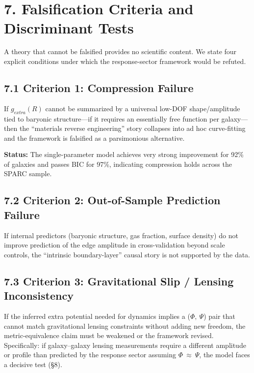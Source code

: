 \section{7. Falsification Criteria and Discriminant Tests}\label{falsification-criteria-and-discriminant-tests}

A theory that cannot be falsified provides no scientific content. We state four explicit conditions under which the response-sector framework would be refuted.

\subsection{7.1 Criterion 1: Compression Failure}\label{criterion-1-compression-failure}

If \(g_{extra}(R)\) cannot be summarized by a universal low-DOF shape/amplitude tied to baryonic structure---if it requires an essentially free function per galaxy---then the ``materials reverse engineering'' story collapses into ad hoc curve-fitting and the framework is falsified as a parsimonious alternative.

\textbf{Status:} The single-parameter model achieves very strong improvement for 92\% of galaxies and passes BIC for 97\%, indicating compression holds across the SPARC sample.

\subsection{7.2 Criterion 2: Out-of-Sample Prediction Failure}\label{criterion-2-out-of-sample-prediction-failure}

If internal predictors (baryonic structure, gas fraction, surface density) do not improve prediction of the edge amplitude in cross-validation beyond scale controls, the ``intrinsic boundary-layer'' causal story is not supported by the data.

\subsection{7.3 Criterion 3: Gravitational Slip / Lensing Inconsistency}\label{criterion-3-gravitational-slip-lensing-inconsistency}

If the inferred extra potential needed for dynamics implies a (\(\Phi,\ \Psi\)) pair that cannot match gravitational lensing constraints without adding new freedom, the metric-equivalence claim must be weakened or the framework revised. Specifically: if galaxy--galaxy lensing measurements require a different amplitude or profile than predicted by the response sector assuming \(\Phi\  \approx \ \Psi\), the model faces a decisive test (§8).

